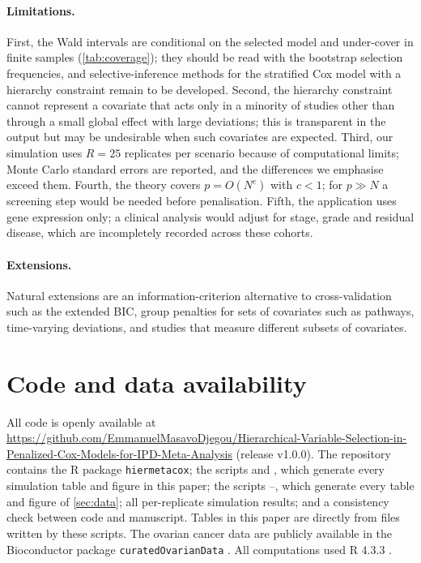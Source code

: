 \documentclass[11pt]{article}
\theoremstyle{remark}
\numberwithin{equation}{section}
\newcommand{\repo}{\url{https://github.com/EmmanuelMasavoDjegou/Hierarchical-Variable-Selection-in-Penalized-Cox-Models-for-IPD-Meta-Analysis}}
\begin{document}
\paragraph{Limitations.} First, the Wald intervals are conditional on the selected
model and under-cover in finite samples (\cref{tab:coverage}); they should be read
with the bootstrap selection frequencies, and selective-inference methods
\citep{Berk2013} for the stratified Cox model with a hierarchy constraint remain to
be developed. Second, the hierarchy constraint cannot represent a covariate that
acts only in a minority of studies other than through a small global effect with
large deviations; this is transparent in the output but may be undesirable when
such covariates are expected. Third, our simulation uses $R=25$ replicates per
scenario because of computational limits; Monte Carlo standard errors are
reported, and the differences we emphasise exceed them. Fourth, the theory covers
$p=O(N^c)$ with $c<1$; for $p\gg N$ a screening step \citep{Fan2008, Fan2010}
would be needed before penalisation. Fifth, the application uses gene expression
only; a clinical analysis would adjust for stage, grade and residual disease, which
are incompletely recorded across these cohorts.

\paragraph{Extensions.} Natural extensions are an information-criterion alternative
to cross-validation such as the extended BIC, group penalties for sets of
covariates such as pathways, time-varying deviations, and studies that measure
different subsets of covariates.


\section*{Code and data availability}
All code is openly available at \repo{} (release v1.0.0). The repository
contains the R package \texttt{hiermetacox}; the scripts
 and
, which generate every simulation
table and figure in this paper; the scripts
--,
which generate every table and figure of \cref{sec:data}; all per-replicate
simulation results; and a consistency check between code and manuscript. Tables
in this paper are \verb|| directly from files written by these scripts. The
ovarian cancer data are publicly available in the Bioconductor package
\texttt{curatedOvarianData} \citep{Ganzfried2013}. All computations used R 4.3.3
\citep{R2024}.
\end{document}
